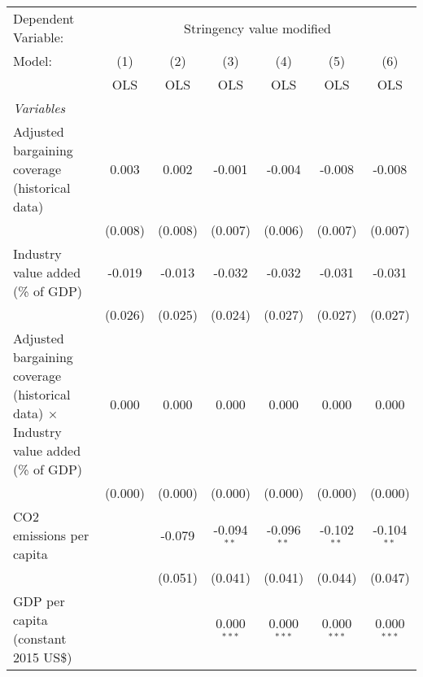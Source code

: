
\begingroup
\centering
\begin{tabular}{lcccccc}
   \toprule
   Dependent Variable: & \multicolumn{6}{c}{Stringency value modified}\\
   Model:                                                                                     & (1)     & (2)     & (3)           & (4)           & (5)           & (6)\\  
                                                                                              &  OLS    & OLS     & OLS           & OLS           & OLS           & OLS\\  
   \midrule
   \emph{Variables}\\
   Adjusted bargaining coverage (historical data)                                             & 0.003   & 0.002   & -0.001        & -0.004        & -0.008        & -0.008\\   
                                                                                              & (0.008) & (0.008) & (0.007)       & (0.006)       & (0.007)       & (0.007)\\   
   Industry value added (\% of GDP)                                                           & -0.019  & -0.013  & -0.032        & -0.032        & -0.031        & -0.031\\   
                                                                                              & (0.026) & (0.025) & (0.024)       & (0.027)       & (0.027)       & (0.027)\\   
   Adjusted bargaining coverage (historical data) $\times$ Industry value added (\% of GDP)   & 0.000   & 0.000   & 0.000         & 0.000         & 0.000         & 0.000\\   
                                                                                              & (0.000) & (0.000) & (0.000)       & (0.000)       & (0.000)       & (0.000)\\   
   CO2 emissions per capita                                                                   &         & -0.079  & -0.094$^{**}$ & -0.096$^{**}$ & -0.102$^{**}$ & -0.104$^{**}$\\   
                                                                                              &         & (0.051) & (0.041)       & (0.041)       & (0.044)       & (0.047)\\   
   GDP per capita (constant 2015 US\$)                                                        &         &         & 0.000$^{***}$ & 0.000$^{***}$ & 0.000$^{***}$ & 0.000$^{***}$\\   

\end{tabular}
